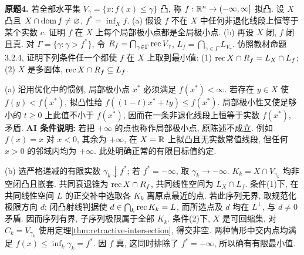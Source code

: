 \begin{exercise}\label{ass:6253-hw3-q4}
\textbf{原题4.} 若全部水平集 $V_\gamma=\{x:f(x)\le\gamma\}$ 凸, 称 $f:\mathbb R^n\to(-\infty,\infty]$ 拟凸. 设 $X$ 凸且 $X\cap\operatorname{dom} f\ne\varnothing$, $f^*=\inf_Xf$.
(a) 假设 $f$ 不在 $X$ 中任何非退化线段上恒等于某个实数 $c$. 证明 $f$ 在 $X$ 上每个局部极小点都是全局极小点.
(b) 再设 $X$ 闭, $f$ 闭且真. 对 $\Gamma=\{\gamma:\gamma>f^*\}$, 令 $R_f=\bigcap_{\gamma\in\Gamma}\operatorname{rec} V_\gamma$, $L_f=\bigcap_{\gamma\in\Gamma}L_{V_\gamma}$. 仿照教材命题3.2.4, 证明下列条件任一个都使 $f$ 在 $X$ 上取到最小值: (1) $\operatorname{rec} X\cap R_f=L_X\cap L_f$; (2) $X$ 是多面体, $\operatorname{rec} X\cap R_f\subseteq L_f$.
\end{exercise}
\begin{solution}
(a) 沿用优化中的惯例, 局部极小点 $x^*$ 必须满足 $f(x^*)<\infty$. 若存在 $y\in X$ 使 $f(y)<f(x^*)$, 拟凸性给 $f((1-t)x^*+ty)\le f(x^*)$. 局部极小性又使足够小的 $t\ge0$ 上此值不小于 $f(x^*)$, 因而在一条非退化线段上恒等于实数 $f(x^*)$, 矛盾.
\textbf{AI 条件说明:} 若把 $+\infty$ 的点也称作局部极小点, 原陈述不成立. 例如 $f(x)=x$ 对 $x<0$, 其余为 $+\infty$, 在 $X=\mathbb R$ 上拟凸且无实数常值线段, 但任何 $x>0$ 的邻域内均为 $+\infty$. 此处明确正常的有限目标值约定.

(b) 选严格递减的有限实数 $\gamma_k\downarrow f^*$; 若 $f^*=-\infty$, 取 $\gamma_k\to-\infty$. $K_k=X\cap V_{\gamma_k}$ 均非空闭凸且嵌套. 共同衰退锥为 $\operatorname{rec} X\cap R_f$, 共同线性空间为 $L_X\cap L_f$.
条件(1)下, 在共同线性空间 $L$ 的正交补中选取各 $K_k$ 离原点最近的点. 若此序列无界, 取规范化极限方向 $d$; 闭凸射线判据使 $d\in\bigcap_k\operatorname{rec} K_k=L$, 而所选点及 $d$ 均在 $L^\perp$, 与 $d\ne0$ 矛盾. 因而序列有界, 子序列极限属于全部 $K_k$.
条件(2)下, $X$ 是可回缩集, 对 $C_k=V_{\gamma_k}$ 使用定理\ref{thm:retractive-intersection}, 得交非空. 两种情形中交内点均满足 $f(x)\le\inf_k\gamma_k=f^*$. 因 $f$ 真, 这同时排除了 $f^*=-\infty$, 所以确有有限最小值.
\end{solution}

